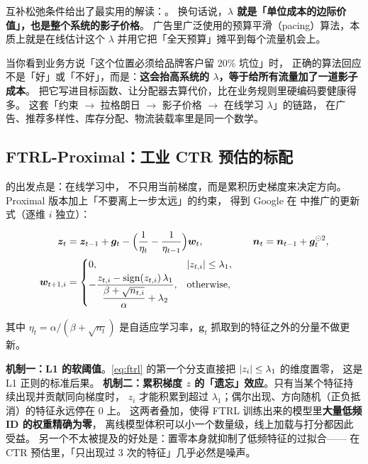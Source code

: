 互补松弛条件给出了最实用的解读：。
换句话说，\textbf{$\lambda$ 就是「单位成本的边际价值」，也是整个系统的影子价格}。
广告里广泛使用的预算平滑（pacing）算法，本质上就是在线估计这个 $\lambda$
并用它把「全天预算」摊平到每个流量机会上。

\begin{insight}[影子价格是一个可以复用的思维模型]
当你看到业务方说「这个位置必须给品牌客户留 20\% 坑位」时，
正确的算法回应不是「好」或「不好」，而是：\textbf{这会抬高系统的 $\lambda$，等于给所有流量加了一道影子成本}。
把它写进目标函数、让分配器去算代价，比在业务规则里硬编码要健康得多。
这套「约束 $\to$ 拉格朗日 $\to$ 影子价格 $\to$ 在线学习 $\lambda$」的链路，
在广告、推荐多样性、库存分配、物流装载率里是同一个数学。
\end{insight}

\subsection{FTRL-Proximal：工业 CTR 预估的标配}

 的出发点是：在线学习中，
不只用当前梯度，而是累积历史梯度来决定方向。Proximal 版本加上「不要离上一步太远」的约束，
得到 Google 在 \cite{mcmahan2013ftrl} 中推广的更新式（逐维 $i$ 独立）：

\begin{equation}
\begin{aligned}
\bm{z}_t &= \bm{z}_{t-1} + \bm{g}_t
- \Big(\frac{1}{\eta_t} - \frac{1}{\eta_{t-1}}\Big)\bm{w}_t, &\quad
\bm{n}_t &= \bm{n}_{t-1} + \bm{g}_t^{\odot 2}, \\
\bm{w}_{t+1,i} &=
\begin{cases}
0, & \left\lvert z_{t,i} \right\rvert \le \lambda_1, \\[2pt]
-\dfrac{z_{t,i} - \text{sign}(z_{t,i})\,\lambda_1}{\dfrac{\beta + \sqrt{n_{t,i}}}{\alpha} + \lambda_2}, & \text{otherwise},
\end{cases}
\end{aligned}
\label{eq:ftrl}
\end{equation}

其中 $\eta_t = \alpha / (\beta + \sqrt{n_t})$ 是自适应学习率，$\bm{g}_t$ 抓取到的特征之外的分量不做更新。

\begin{insight}
\textbf{机制一：L1 的软阈值}。\cref{eq:ftrl} 的第一个分支直接把 $\left\lvert z_i \right\rvert \le \lambda_1$ 的维度置零，
这是 L1 正则的标准后果。
\textbf{机制二：累积梯度 $z$ 的「遗忘」效应}。只有当某个特征持续出现并贡献同向梯度时，
$z_i$ 才能积累到超过 $\lambda_1$；偶尔出现、方向随机（正负抵消）的特征永远停在 0 上。
这两者叠加，使得 FTRL 训练出来的模型里\textbf{大量低频 ID 的权重精确为零}，
离线模型体积可以小一个数量级，线上加载与打分都因此受益。
另一个不太被提及的好处是：置零本身就抑制了低频特征的过拟合——
在 CTR 预估里，「只出现过 3 次的特征」几乎必然是噪声。
\end{insight}

